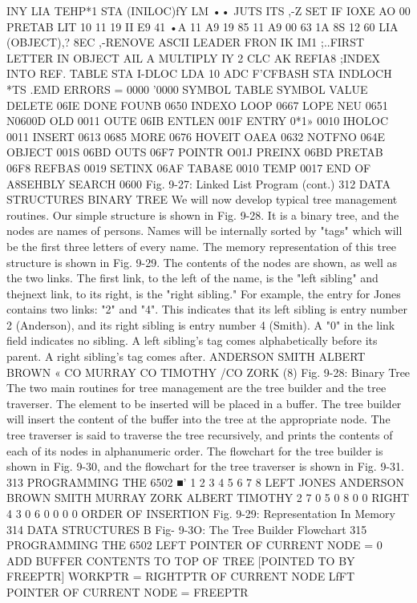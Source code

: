 {{{{{{{{{{{{{{{{{{{{{{{{{{{{{INY
LIA TEHP*1
STA (INILOC)fY
LM ••
JUTS ITS ,-Z SET IF IOXE
AO 00 PRETAB LIT 10
11 19
II
E9 41
•A
11
A9 19
85 11
A9 00
63 1A
8S 12
60
LIA (OBJECT),?
8EC ,-RENOVE ASCII LEADER FRON
IK IM1 ;..FIRST LETTER IN OBJECT
AIL A MULTIPLY IY 2
CLC
AK REFIA8 ;INDEX INTO REF. TABLE
STA I-DLOC
LDA 10
ADC F'CFBASH
STA INDLOCH
*TS
.EMD
ERRORS = 0000 '0000
SYMBOL TABLE
SYMBOL VALUE
DELETE 06IE DONE
FOUNB 0650 INDEXO
LOOP 0667 LOPE
NEU 0651 N0600D
OLD 0011 OUTE
06IB ENTLEN 001F ENTRY 0*1»
0010 IHOLOC 0011 INSERT 0613
0685 MORE 0676 HOVEIT OAEA
0632 NOTFNO 064E OBJECT 001S
06BD OUTS 06F7 POINTR O01J
PREINX 06BD PRETAB 06F8 REFBAS 0019
SETINX 06AF TABA8E 0010 TEMP 0017
END OF A8SEHBLY
SEARCH 0600
Fig. 9-27: Linked List Program (cont.)
312
DATA STRUCTURES
BINARY TREE
We will now develop typical tree management routines. Our simple
structure is shown in Fig. 9-28. It is a binary tree, and the nodes are
names of persons. Names will be internally sorted by "tags" which will
be the first three letters of every name. The memory representation of
this tree structure is shown in Fig. 9-29. The contents of the nodes are
shown, as well as the two links. The first link, to the left of the name, is
the "left sibling" and thejnext link, to its right, is the "right sibling."
For example, the entry for Jones contains two links: "2" and "4". This
indicates that its left sibling is entry number 2 (Anderson), and its right
sibling is entry number 4 (Smith). A "0" in the link field indicates no
sibling. A left sibling's tag comes alphabetically before its parent. A
right sibling's tag comes after.
ANDERSON SMITH
ALBERT BROWN
« CO
MURRAY
CO
TIMOTHY
/CO
ZORK
(8)
Fig. 9-28: Binary Tree
The two main routines for tree management are the tree builder
and the tree traverser. The element to be inserted will be placed in
a buffer. The tree builder will insert the content of the buffer into
the tree at the appropriate node. The tree traverser is said to
traverse the tree recursively, and prints the contents of each of its
nodes in alphanumeric order. The flowchart for the tree builder is
shown in Fig. 9-30, and the flowchart for the tree traverser is shown in
Fig. 9-31.
313
PROGRAMMING THE 6502
■'
1
2
3
4
5
6
7
8
LEFT
JONES
ANDERSON
BROWN
SMITH
MURRAY
ZORK
ALBERT
TIMOTHY
2
7
0
5
0
8
0
0
RIGHT
4
3
0
6
0
0
0
0
ORDER
OF INSERTION
Fig. 9-29: Representation In Memory
314
DATA STRUCTURES
B
Fig- 9-3O: The Tree Builder Flowchart
315
PROGRAMMING THE 6502
LEFT
POINTER OF
CURRENT
NODE = 0
ADD BUFFER
CONTENTS TO
TOP OF TREE
[POINTED TO
BY FREEPTR]
WORKPTR =
RIGHTPTR OF
CURRENT NODE
LfFT POINTER
OF CURRENT NODE
= FREEPTR
}}}}}}}}}}}}}}}}}}}}}}}}}}}}}
